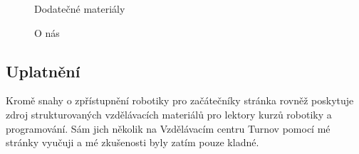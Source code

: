 \documentclass[a4paper, 12pt, twoside]{article}
\begin{document}
  \begin{figure}[H]
      \caption{Dodatečné materiály} \label{img:Dodatečné materiály}
    \endminipage\hfill
      \caption{O nás} \label{img:O nás}
    \endminipage
  \end{figure}


  \subsection{Uplatnění}
  Kromě snahy o zpřístupnění robotiky pro začátečníky stránka rovněž poskytuje zdroj strukturovaných vzdělávacích materiálů pro lektory kurzů robotiky a programování. Sám jich několik na Vzdělávacím centru Turnov pomocí mé stránky vyučuji a mé zkušenosti byly zatím pouze kladné.
\end{document}
